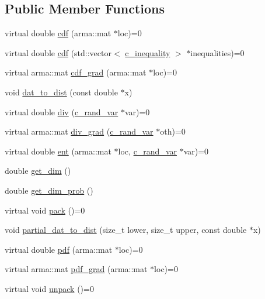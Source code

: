 \subsection*{\-Public \-Member \-Functions}
\begin{DoxyCompactItemize}
\item 
virtual double \hyperlink{classc__rand__var_af0642e6451929280d9e891a2ccc1cda2}{cdf} (arma\-::mat $\ast$loc)=0
\item 
virtual double \hyperlink{classc__rand__var_aab4b9f6c1fb36b312010c884eda79a34}{cdf} (std\-::vector$<$ \hyperlink{classc__inequality}{c\-\_\-inequality} $>$ $\ast$inequalities)=0
\item 
virtual arma\-::mat \hyperlink{classc__rand__var_a6568080871f61f97a41403703821382f}{cdf\-\_\-grad} (arma\-::mat $\ast$loc)=0
\item 
void \hyperlink{classc__rand__var_a6f6444f2ecadfa4f331ac3d6db5a11e0}{dat\-\_\-to\-\_\-dist} (const double $\ast$x)
\item 
virtual double \hyperlink{classc__rand__var_a784534f9e6efae57d7a97638a73ed6a7}{div} (\hyperlink{classc__rand__var}{c\-\_\-rand\-\_\-var} $\ast$var)=0
\item 
virtual arma\-::mat \hyperlink{classc__rand__var_a9de6c00c256815f16fc79158cf5faed5}{div\-\_\-grad} (\hyperlink{classc__rand__var}{c\-\_\-rand\-\_\-var} $\ast$oth)=0
\item 
virtual double \hyperlink{classc__rand__var_ad3498ddaa214968329cfde0ddd014e9f}{ent} (arma\-::mat $\ast$loc, \hyperlink{classc__rand__var}{c\-\_\-rand\-\_\-var} $\ast$var)=0
\item 
double \hyperlink{classc__rand__var_adaa290ff5474bcb3e1d9435ad40760a3}{get\-\_\-dim} ()
\item 
double \hyperlink{classc__rand__var_a9a49e11be71157d78cec2093d65f1193}{get\-\_\-dim\-\_\-prob} ()
\item 
virtual void \hyperlink{classc__rand__var_a341609737c79d17bc124917bd8c1200c}{pack} ()=0
\item 
void \hyperlink{classc__rand__var_a878978cf57b2072ba32bcaab8da04a74}{partial\-\_\-dat\-\_\-to\-\_\-dist} (size\-\_\-t lower, size\-\_\-t upper, const double $\ast$x)
\item 
virtual double \hyperlink{classc__rand__var_abbb41e718f8b417f251e7578311b644d}{pdf} (arma\-::mat $\ast$loc)=0
\item 
virtual arma\-::mat \hyperlink{classc__rand__var_a67f5455a4fcb957cf6dfc060a3d7be96}{pdf\-\_\-grad} (arma\-::mat $\ast$loc)=0
\item 
virtual void \hyperlink{classc__rand__var_aba4668d9a6e515c488b8e5764ef83977}{unpack} ()=0
\end{DoxyCompactItemize}
